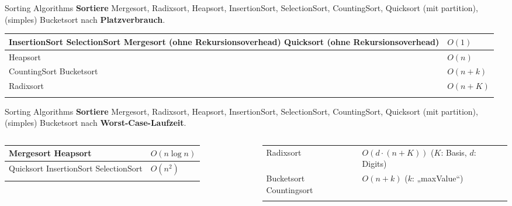 \begin{frame}{Sorting Algorithms}
	\textbf{Sortiere} Mergesort, Radixsort, Heapsort, InsertionSort, SelectionSort, CountingSort, Quicksort {\small (mit partition)}, (simples) Bucketsort nach \textbf{Platzverbrauch}. \\
	\pause
	\forcenewline
	\centering
	\begin{tabular}{m{.55\linewidth} | m{.15\linewidth} }
		\hhline{=|=}
		InsertionSort \newline 
		SelectionSort \newline
		Mergesort (ohne Rekursionsoverhead) \newline
		Quicksort (ohne Rekursionsoverhead) & $O(1)$ \\
		\hline
		Heapsort & $O(n)$ \\
		\hhline{=|=}
		CountingSort \newline 
		Bucketsort & $O(n+k)$ \\
		\hhline{=|=}
		Radixsort & $O(n+K)$ \\
		\hhline{=|=}
	\end{tabular}
\end{frame}

\begin{frame}{Sorting Algorithms}
	\textbf{Sortiere} Mergesort, Radixsort, Heapsort, InsertionSort, SelectionSort, CountingSort, Quicksort {\small (mit partition)}, (simples) Bucketsort nach \textbf{Worst-Case-Laufzeit}. \\ 
	\pause
	\forcenewline
	\begin{columns}
		\begin{tabular}{m{.4\linewidth} | m{.3\linewidth} }
			\hhline{=|=}
			Mergesort \newline
			Heapsort & $O(n \log n)$ \\
			\hline
			Quicksort \newline 
			InsertionSort \newline 
			SelectionSort & $O(n^2)$ \\
			\hhline{=|=}
		\end{tabular}
		\hspace{-2\baselineskip}
		\begin{tabular}{m{.37\linewidth} | m{.47\linewidth} }
			\hhline{=|=}
			Radixsort & $O(d \cdot (n + K))$ \newline ($K$: Basis, \newline $d$: Digits)\\
			\hhline{=|=}
			Bucketsort \newline
			Countingsort & $O(n+k)$ \newline ($k$: „maxValue“) \\
			\hhline{=|=}
		\end{tabular}
	\end{columns}
\end{frame}

